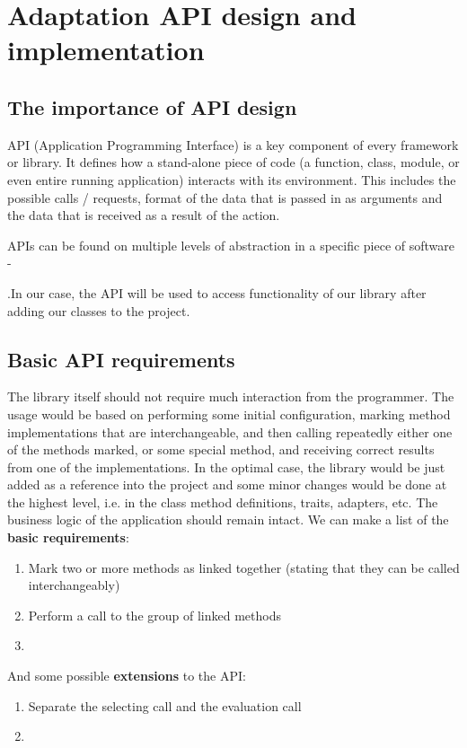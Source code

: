 \chapter{Adaptation API design and implementation}
\label{chapter:api}

\section{The importance of API design}

API (Application Programming Interface) is a key component of every framework or library. It defines how a stand-alone piece of code (a function, class, module, or even entire running application) interacts with its environment. This includes the possible calls / requests, format of the data that is passed in as arguments and the data that is received as a result of the action.

APIs can be found on multiple levels of abstraction in a specific piece of software - %

.In our case, the API will be used to access functionality of our library after adding our classes to the project.

\section{Basic API requirements}

The library itself should not require much interaction from the programmer. The usage would be based on performing some initial configuration, marking method implementations that are interchangeable, and then calling repeatedly either one of the methods marked, or some special method, and receiving correct results from one of the implementations.
In the optimal case, the library would be just added as a reference into the project and some minor changes would be done at the highest level, i.e. in the class method definitions, traits, adapters, etc. The business logic of the application should remain intact.
We can make a list of the \textbf{basic requirements}:
\begin{enumerate}
	\item Mark two or more methods as linked together (stating that they can be called interchangeably)
	\item Perform a call to the group of linked methods
	\item %
\end{enumerate}

And some possible \textbf{extensions} to the API:
\begin{enumerate}
	\item Separate the selecting call and the evaluation call
	\item %
\end{enumerate}

